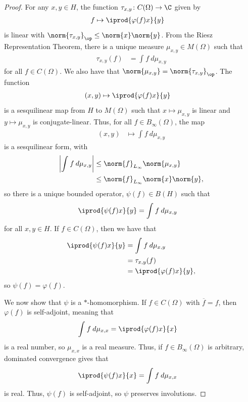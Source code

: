 \documentclass[10pt]{mypackage}
\begin{document}
\begin{proof}
  For any $x,y\in H$, the function $\tau_{x,y}\colon C(\Omega)\rightarrow \C$ given by
  \begin{align*}
    f &\mapsto \iprod{\varphi(f)x}{y}
  \end{align*}
  is linear with $\norm{\tau_{x,y}}_{\op}\leq \norm{x}\norm{y}$. From the Riesz Representation Theorem, there is a unique measure $\mu_{x,y}\in M(\Omega)$ such that 
  \begin{align*}
    \tau_{x,y}(f) &= \int_{}^{} f\:d\mu_{x,y}
  \end{align*}
  for all $f\in C(\Omega)$. We also have that $\norm{\mu_{x,y}} = \norm{\tau_{x,y}}_{\op}$. The function
  \begin{align*}
    \left( x,y \right) &\mapsto \iprod{\varphi(f)x}{y}
  \end{align*}
  is a sesquilinear map from $H$ to $M(\Omega)$ such that $x\mapsto \mu_{x,y}$ is linear and $y\mapsto \mu_{x,y}$ is conjugate-linear. Thus, for all $f\in B_{\infty}(\Omega)$, the map
  \begin{align*}
    \left( x,y \right) &\mapsto \int_{}^{} f\:d\mu_{x,y}
  \end{align*}
  is a sesquilinear form, with
  \begin{align*}
    \left\vert \int_{}^{} f\:d\mu_{x,y} \right\vert &\leq \norm{f}_{L_{\infty}}\norm{\mu_{x,y}}\\
                                                    &\leq \norm{f}_{L_{\infty}}\norm{x}\norm{y},
  \end{align*}
  so there is a unique bounded operator, $\psi(f)\in B(H)$ such that
  \begin{align*}
    \iprod{\psi(f)x}{y} &= \int_{}^{} f\:d\mu_{x,y}
  \end{align*}
  for all $x,y\in H$. If $f\in C(\Omega)$, then we have that
  \begin{align*}
    \iprod{\psi(f)x}{y} &= \int_{}^{} f\:d\mu_{x,y}\\
                        &= \tau_{x,y}(f)\\
                        &= \iprod{\varphi(f)x}{y},
  \end{align*}
  so $\psi(f) = \varphi(f)$.

  We now show that $\psi$ is a $\ast$-homomorphism. If $f\in C(\Omega)$ with $ \overline{f} = f $, then $\varphi(f)$ is self-adjoint, meaning that
  \begin{align*}
    \int_{}^{} f\:d\mu_{x,x} &= \iprod{\varphi(f)x}{x}
  \end{align*}
  is a real number, so $\mu_{x,x}$ is a real measure. Thus, if $f\in B_{\infty}(\Omega)$ is arbitrary, dominated convergence gives that
  \begin{align*}
    \iprod{\psi(f)x}{x} &= \int_{}^{} f\:d\mu_{x,x}
  \end{align*}
  is real. Thus, $\psi(f)$ is self-adjoint, so $\psi$ preserves involutions.


\end{proof}
\end{document}
